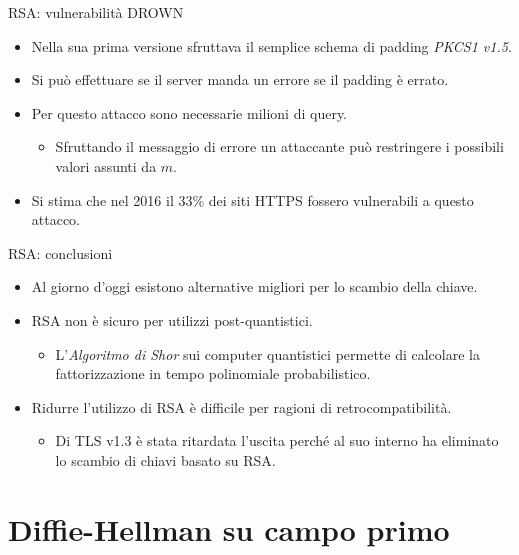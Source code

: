 \documentclass[11pt,svgnames,smaller,aspectratio=169,italian]{beamer}
\begin{document}
\begin{frame}{RSA: vulnerabilità DROWN}
	\begin{itemize}
		\item Nella sua prima versione sfruttava il semplice schema di padding \emph{PKCS1 v1.5}.
		\item Si può effettuare se il server manda un errore se il padding è errato.
		\item Per questo attacco sono necessarie milioni di query.
			\begin{itemize}
				\item Sfruttando il messaggio di errore un attaccante può restringere i possibili valori assunti da $m$.
			\end{itemize}
		\item Si stima che nel 2016 il 33\% dei siti HTTPS fossero vulnerabili a questo attacco.
	\end{itemize}
\end{frame}


\begin{frame}{RSA: conclusioni}
	\begin{itemize}
		\item Al giorno d'oggi esistono alternative migliori per lo scambio della chiave.
		\item RSA non è sicuro per utilizzi post-quantistici.
			\begin{itemize}
				\item L'\emph{Algoritmo di Shor} sui computer quantistici permette di calcolare la fattorizzazione in tempo polinomiale probabilistico.
			\end{itemize}
		\item Ridurre l'utilizzo di RSA è difficile per ragioni di retrocompatibilità.
			\begin{itemize}
				\item Di TLS v1.3 è stata ritardata l'uscita perché al suo interno ha eliminato lo scambio di chiavi basato su RSA.
			\end{itemize}
	\end{itemize}
\end{frame}

\section{Diffie-Hellman su campo primo}
\begin{frame}
	\sectionpage
	\centering
\end{frame}
\end{document}
